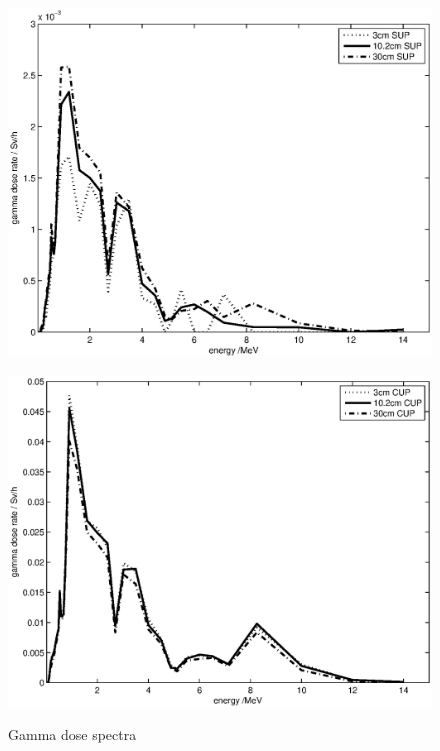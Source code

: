 \documentclass[11pt,a4paper]{IEEEtran}
\let\MYoriglatexcaption\caption
\renewcommand{\caption}[2][\relax]{\MYoriglatexcaption[#2]{#2}}
\begin{document}
\begin{figure}[t]
    \begin{minipage}{\columnwidth}
        \includegraphics[width=\columnwidth]{DoseVSenergySUP.eps}
        \label{fig:GammaDoseEnergySUP}
    \end{minipage}
    \begin{minipage}{\columnwidth}
        \includegraphics[width=\columnwidth]{DoseVSenergyCUP.eps}
        \label{fig:GammaDoseEnergyCUP}
    \end{minipage}
    \caption{Gamma dose spectra}
    \label{fig:GammaDoseEnergy}
\end{figure}
\end{document}
